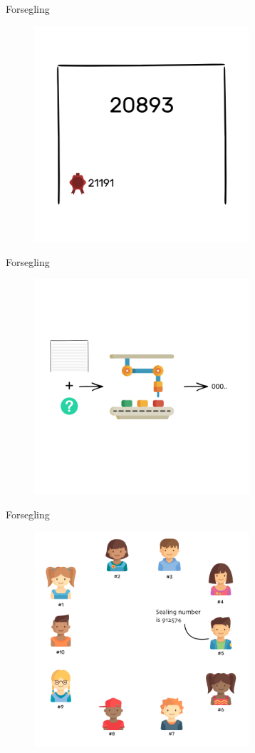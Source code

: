 \documentclass[usenames, dvipsnames]{beamer}
\begin{document}
  \begin{frame}{Forsegling}
    \begin{figure}[ht!]
    \centering
    \includegraphics[width=80mm]{images/magic_machine_found.png}
    \end{figure}
  \end{frame}
  \begin{frame}{Forsegling}
    \begin{figure}[ht!]
    \centering
    \includegraphics[width=80mm]{images/magic_machine_seal_page.png}
    \end{figure}
  \end{frame}
  \begin{frame}{Forsegling}
    \begin{figure}[ht!]
    \centering
    \includegraphics[width=80mm]{images/all_people_seal.png}
    \end{figure}
  \end{frame}
\end{document}
